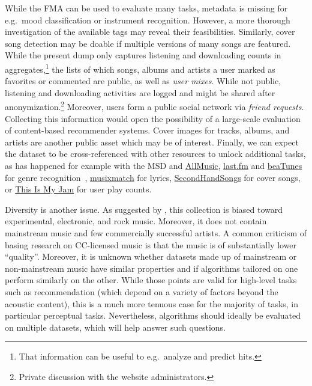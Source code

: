 \documentclass{article}
\newcommand{\todo}[1]{{\color{red} #1}}
\begin{document}

While the FMA can be used to evaluate many tasks, metadata is missing for e.g.\ mood classification or instrument recognition. However, a more thorough investigation of the available tags may reveal their feasibilities. Similarly, cover song detection may be doable if multiple versions of many songs are featured.
While the present dump only captures listening and downloading counts in aggregates,\footnote{That information can be useful to e.g.\ analyze and predict hits.} the lists of which songs, albums and artists a user marked as favorites or commented are public, as well as \textit{user mixes}. While not public, listening and downloading activities are logged and might be shared after anonymization.\footnote{Private discussion with the website administrators.} Moreover, users form a public social network via \textit{friend requests}.
Collecting this information would open the possibility of a large-scale evaluation of content-based recommender systems.
Cover images for tracks, albums, and artists are another public asset which may be of interest.
Finally, we can expect the dataset to be cross-referenced with other resources to unlock additional tasks, as has happened for example with the MSD and \href{http://www.allmusic.com}{AllMusic}, \href{https://www.last.fm}{last.fm} and \href{https://beatunes.com}{beaTunes} for genre recognition~\cite{msd_features, msd_genres}, \href{https://musixmatch.com}{musixmatch} for lyrics, \href{https://secondhandsongs.com}{SecondHandSongs} for cover songs, or \href{https://www.thisismyjam.com}{This Is My Jam} for user play counts.

Diversity is another issue. As suggested by , this collection is biased toward experimental, electronic, and rock music. Moreover, it does not contain mainstream music and few commercially successful artists.
A common criticism of basing research on CC-licensed music is that the music is of substantially lower ``quality''. Moreover, it is unknown whether datasets made up of mainstream or non-mainstream music have similar properties and if algorithms tailored on one perform similarly on the other. While those points are valid for high-level tasks such as recommendation (which depend on a variety of factors beyond the acoustic content), this is a much more tenuous case for the majority of tasks, in particular perceptual tasks.
Nevertheless, algorithms should ideally be evaluated on multiple datasets, which will help answer such questions.
\end{document}
